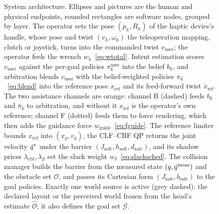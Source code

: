 \begin{figure}[t]
{}
\caption{System architecture. Ellipses and pictures are the human and physical endpoints, rounded rectangles are software nodes, grouped by layer. The operator sets the pose $(p_h, R_h)$ of the haptic device's handle, whose pose and twist $(v_h, \omega_h)$ the teleoperation mapping, clutch or joystick, turns into the commanded twist $v_{\text{user}}$; the operator feels the wrench $w_h$~\eqref{eq:wtotal}. Intent estimation scores $v_{\text{user}}$ against the per-goal policies $\pi_k^{\text{user}}$ into the belief $b_k$, and arbitration blends $v_{\text{user}}$ with the belief-weighted policies $\pi_k$~\eqref{eq:blend} into the reference pose $x_{\text{ref}}$ and its feed-forward twist $\dot{x}_{\text{ref}}$. The two assistance channels are orange: channel B (dashed) feeds $b_k$ and $\pi_k$ to arbitration, and without it $x_{\text{ref}}$ is the operator's own reference; channel F (dotted) feeds them to force rendering, which then adds the guidance force $w_{\text{guide}}$~\eqref{eq:fguide}. The reference limiter bounds $x_{\text{ref}}$ into $(x_g, v_g)$, the CLF--CBF QP returns the joint velocity $\dot{q}^{\star}$ under the barrier $(J_{\text{soft}}, h_{\text{soft}}, d_{\text{safe}})$, and its shadow prices $\lambda_{\text{cbf}}, \lambda_{\text{jl}}$ set the slack weight $w_\delta$~\eqref{eq:slacksched}. The collision manager builds the barrier from the measured state $(q, \dot{q}^{\text{meas}})$ and the obstacle set $\mathcal{O}$, and passes its Cartesian form $(J_{\text{safe}}, b_{\text{safe}})$ to the goal policies. Exactly one world source is active (grey dashed): the declared layout or the perceived world frozen from the head's estimate $\hat{\mathcal{O}}$; it also defines the goal set $\mathcal{G}$.}
\label{fig:arch}
\end{figure}

